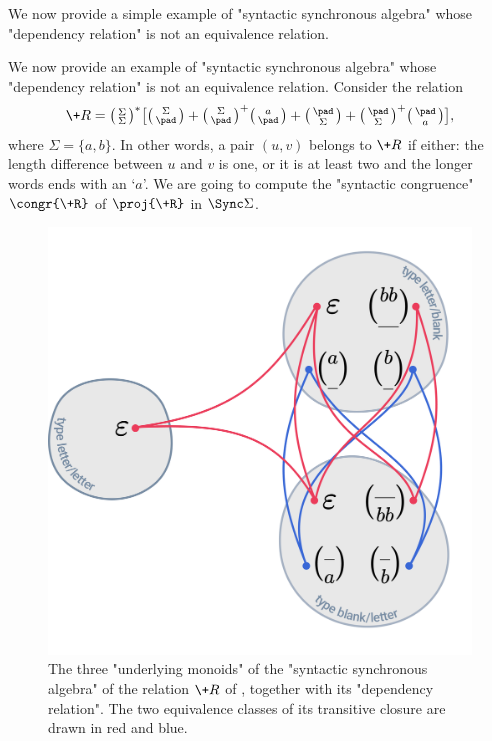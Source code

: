 We now provide a simple example of
"syntactic synchronous algebra" whose "dependency relation" is not an equivalence relation.  
\begin{example}
	\label{ex:last_letter_is_a_if_big_diff}
	We now provide an example of "syntactic synchronous algebra" whose "dependency relation"
	is not an equivalence relation.
	Consider the relation
	\[
		\+R = \pair{\Sigma}{\Sigma}^*\bigl[
			\pair{\Sigma}{\pad} + \pair{\Sigma}{\pad}^+ \pair{a}{\pad}
			+ \pair{\pad}{\Sigma} + \pair{\pad}{\Sigma}^+ \pair{\pad}{a}
		\bigr],
	\]
	where $\Sigma = \{a,b\}$.
	In other words, a pair $(u,v)$ belongs to $\+R$ if either:
	the length difference between $u$ and $v$ is one, or 
	it is at least two and the longer words ends with an `$a$'.
	We are going to compute the "syntactic congruence" $\congr{\+R}$ of $\proj{\+R}$ in $\Sync\Sigma$.

	\begin{figure}[htbp]
		\begin{center}
			\includegraphics[width=.6\linewidth]{fig/algebra/example_syntactic_algebra.png}
		\end{center}
		\caption{
			\label{fig:example_syntactic_algebra}
			The three "underlying monoids" of the "syntactic synchronous algebra" of the relation
			$\+R$ of , together with its "dependency relation". The two equivalence classes of its transitive closure are drawn in red and blue.
		} 
	\end{figure}


\end{example}
